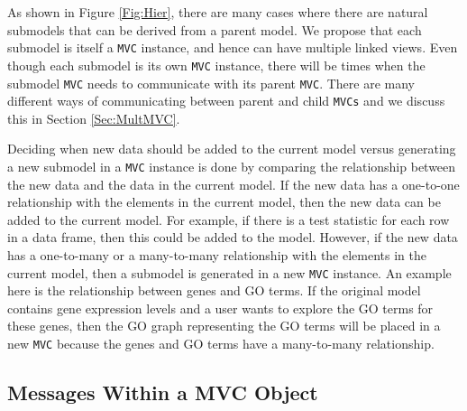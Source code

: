 \documentclass[11pt]{article}
\newcommand{\Robject}[1]{{\texttt{#1}}}
\begin{document}
As shown in Figure \ref{Fig:Hier}, there are many cases where there are
natural submodels that can be derived from a parent model.  We propose that
each submodel is itself a \Robject{MVC} instance, and hence can have multiple
linked views.  Even though each submodel is its own \Robject{MVC} instance,
there will be times when the submodel \Robject{MVC} needs to communicate with
its parent \Robject{MVC}.  There are many different ways of communicating
between parent and child \Robject{MVCs} and we discuss this in Section
\ref{Sec:MultMVC}.

Deciding when new data should be added to the current model versus generating
a new submodel in a \Robject{MVC} instance is done by comparing the
relationship between the new data and the data in the current model.  If the
new data has a one-to-one relationship with the elements in the current model,
then the new data can be added to the current model.  For example, if there is
a test statistic for each row in a data frame, then this could be added to the
model.  However, if the new data has a one-to-many or a many-to-many
relationship with the elements in the current model, then a submodel is
generated in a new \Robject{MVC} instance.  An example here is the
relationship between genes and GO terms.  If the original model contains gene
expression levels and a user wants to explore the GO terms for these genes,
then the GO graph representing the GO terms will be placed in a new
\Robject{MVC} because the genes and GO terms have a many-to-many relationship.


\subsection{Messages Within a MVC Object}
\label{Ssec:OneMess}
\end{document}
